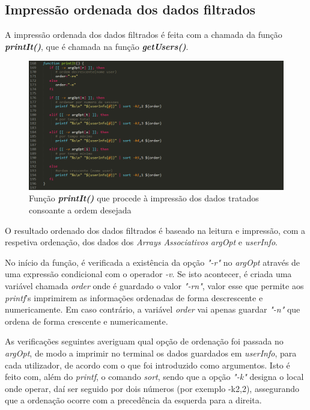 \documentclass[10pt,portuguese]{article}
\begin{document}
\subsection{Impressão ordenada dos dados filtrados}
\par A impressão ordenada dos dados filtrados é feita com a chamada da função \textbf{\textit{printIt()}}, que é chamada na função \textbf{\textit{getUsers()}}.
\begin{figure}[!h]
    \centering
    \includegraphics[width=\textwidth]{printit.png}
    \caption{Função \textbf{\textit{printIt()}} que procede à impressão dos dados tratados consoante a ordem desejada}
\end{figure}
\par O resultado ordenado dos dados filtrados é baseado na leitura e impressão, com a respetiva ordenação, dos dados dos \textit{Arrays Associativos} \textit{argOpt} e \textit{userInfo}.
\par No início da função, é verificada a existência da opção \textit{"-r"} no \textit{argOpt} através de uma expressão condicional com o operador \textit{-v}. Se isto acontecer, é criada uma variável chamada \textit{order} onde é guardado o valor \textit{"-rn"}, valor esse que permite aos \textit{printf}'s imprimirem as informações ordenadas de forma descrescente e numericamente. Em caso contrário, a variável \textit{order} vai apenas guardar \textit{"-n"} que ordena de forma crescente e numericamente.
\par As verificações seguintes averiguam qual opção de ordenação foi passada no \textit{argOpt}, de modo a imprimir no terminal os dados guardados em \textit{userInfo}, para cada utilizador, de acordo com o que foi introduzido como argumentos. Isto é feito com, além do \textit{printf}, o comando \textit{sort}, sendo que a opção \textit{"-k"} designa o local onde operar, daí ser seguido por dois números (por exemplo -k2,2), assegurando que a ordenação ocorre com a precedência da esquerda para a direita.
\end{document}
